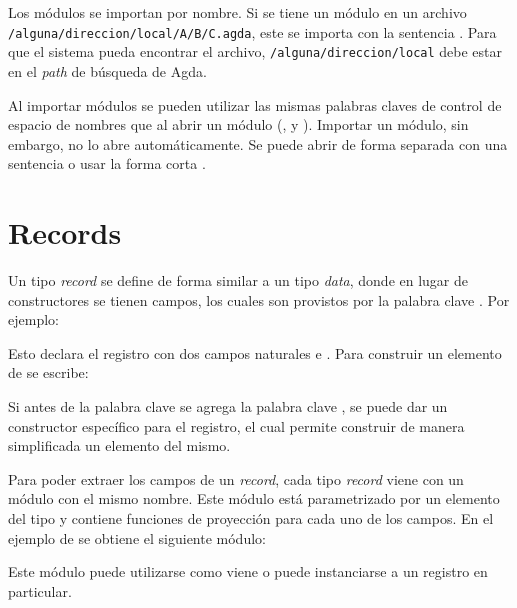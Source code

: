 Los módulos se importan por nombre. Si se tiene un módulo  en un archivo \texttt{/alguna/direccion/local/A/B/C.agda}, este se importa con la sentencia  . Para que el sistema pueda encontrar el archivo, \texttt{/alguna/direccion/local} debe estar en el \textit{path} de búsqueda de Agda. 

Al importar módulos se pueden utilizar las mismas palabras claves de control de espacio de nombres que al abrir un módulo (,  y ). Importar un módulo, sin embargo, no lo abre automáticamente. Se puede abrir de forma separada con una sentencia  o usar la forma corta  .

\section{Records}\label{agda:records}

Un tipo \textit{record} se define de forma similar a un tipo \textit{data}, donde en lugar de constructores se tienen campos, los cuales son provistos por la palabra clave . Por ejemplo: 


Esto declara el registro  con dos campos naturales  e . Para construir un elemento de  se escribe:


Si antes de la palabra clave  se agrega la palabra clave , se puede dar un constructor específico para el registro, el cual permite construir de manera simplificada un elemento del mismo. 


Para poder extraer los campos de un \textit{record}, cada tipo \textit{record} viene con un módulo con el mismo nombre. Este módulo está parametrizado por un elemento del tipo y contiene funciones de proyección para cada uno de los campos. En el ejemplo de  se obtiene el siguiente módulo:


Este módulo puede utilizarse como viene o puede instanciarse a un registro en particular. 


